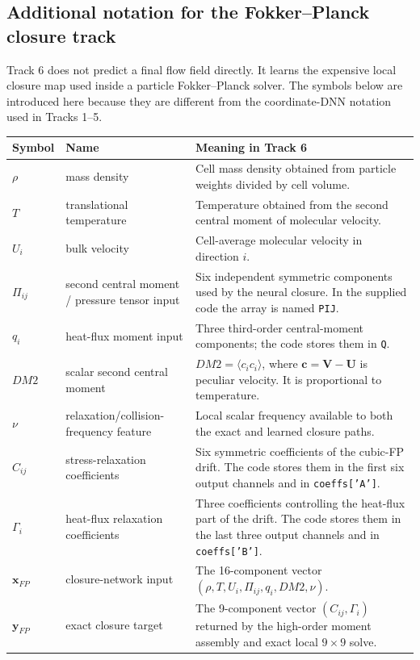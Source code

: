 \documentclass[11pt]{article}
\begin{document}
\subsection{Additional notation for the Fokker--Planck closure track}
Track 6 does not predict a final flow field directly. It learns the expensive local closure map used inside a particle Fokker--Planck solver. The symbols below are introduced here because they are different from the coordinate-DNN notation used in Tracks 1--5.

\begin{tabularx}{\textwidth}{@{}p{}p{}Y@{}}
\toprule
\textbf{Symbol} & \textbf{Name} & \textbf{Meaning in Track 6}\\
\midrule
$\rho$ & mass density & Cell mass density obtained from particle weights divided by cell volume.\\
$T$ & translational temperature & Temperature obtained from the second central moment of molecular velocity.\\
$U_i$ & bulk velocity & Cell-average molecular velocity in direction $i$.\\
$\Pi_{ij}$ & second central moment / pressure tensor input & Six independent symmetric components used by the neural closure. In the supplied code the array is named \texttt{PIJ}.\\
$q_i$ & heat-flux moment input & Three third-order central-moment components; the code stores them in \texttt{Q}.\\
$DM2$ & scalar second central moment & $DM2=\langle c_i c_i\rangle$, where $\mathbf c=\mathbf V-\mathbf U$ is peculiar velocity. It is proportional to temperature.\\
$\nu$ & relaxation/collision-frequency feature & Local scalar frequency available to both the exact and learned closure paths.\\
$C_{ij}$ & stress-relaxation coefficients & Six symmetric coefficients of the cubic-FP drift. The code stores them in the first six output channels and in \texttt{coeffs['A']}.\\
$\Gamma_i$ & heat-flux relaxation coefficients & Three coefficients controlling the heat-flux part of the drift. The code stores them in the last three output channels and in \texttt{coeffs['B']}.\\
$\mathbf x_{FP}$ & closure-network input & The 16-component vector $(\rho,T,U_i,\Pi_{ij},q_i,DM2,\nu)$.\\
$\mathbf y_{FP}$ & exact closure target & The 9-component vector $(C_{ij},\Gamma_i)$ returned by the high-order moment assembly and exact local $9\times9$ solve.\\
\bottomrule
\end{tabularx}
\end{document}

